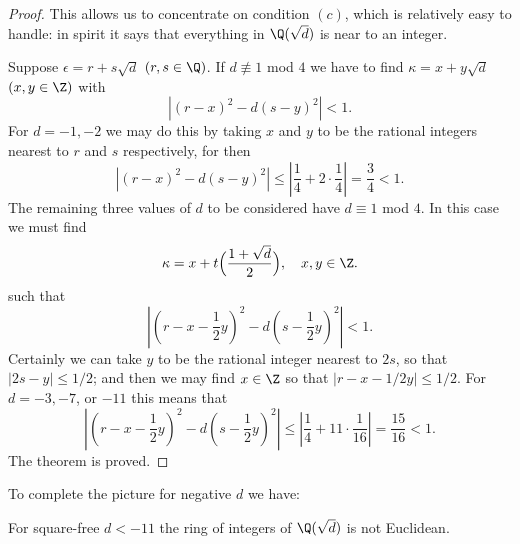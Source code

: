 \begin{proof}
This allows us to concentrate on condition $(c)$, which is relatively easy to handle: in spirit it says that everything in $\Q(\sqrt{d})$ is near to an integer.\par
Suppose $\epsilon=r+s\sqrt{d}$ $(r,s\in\Q)$. If $d\not\equiv 1$ mod $4$ we have to find $\kappa=x+y\sqrt{d}$ $(x,y\in\Z)$ with
\[|(r-x)^2-d(s-y)^2|<1.\]
For $d=-1,-2$ we may do this by taking $x$ and $y$ to be the rational integers
nearest to $r$ and $s$ respectively, for then
\[|(r-x)^2-d(s-y)^2|\leq|\frac{1}{4}+2\cdot\frac{1}{4}|=\frac{3}{4}<1.\]
The remaining three values of $d$ to be considered have $d\equiv1$ mod $4$. In this case we must find
\[\kappa=x+t\Big(\frac{1+\sqrt{d}}{2}\Big),\quad x,y\in\Z.\]
such that
\[|(r-x-\frac{1}{2}y)^2-d(s-\frac{1}{2}y)^2|<1.\]
Certainly we can take $y$ to be the rational integer nearest to $2s$, so that $|2s-y|\leq1/2$; and then we may find $x\in\Z$ so that $|r-x-1/2y|\leq 1/2$. For $d=-3,-7$, or $-11$ this means that
\[|(r-x-\frac{1}{2}y)^2-d(s-\frac{1}{2}y)^2|\leq|\frac{1}{4}+11\cdot\frac{1}{16}|=\frac{15}{16}<1.\]
The theorem is proved.
\end{proof}
To complete the picture for negative $d$ we have:
\begin{theorem}\label{int ring no ED}
For square-free $d<-11$ the ring of integers of $\Q(\sqrt{d})$ is not Euclidean.
\end{theorem}
